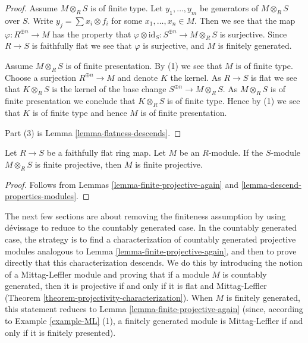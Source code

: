 \begin{proof}
Assume $M \otimes_R S$ is of finite type. Let $y_1, \ldots, y_m$ be generators
of $M \otimes_R S$ over $S$. Write $y_j = \sum x_i \otimes f_i$ for some
$x_1, \ldots, x_n \in M$. Then we see that the map
$\varphi : R^{\oplus n} \to M$
has the property that
$\varphi \otimes \text{id}_S : S^{\oplus n} \to M \otimes_R S$
is surjective. Since $R \to S$ is faithfully flat we see that
$\varphi$ is surjective, and $M$ is finitely generated.

\medskip\noindent
Assume $M \otimes_R S$ is of finite presentation. By (1) we see that
$M$ is of finite type. Choose a surjection $R^{\oplus n} \to M$ and
denote $K$ the kernel. As $R \to S$ is flat we see that $K \otimes_R S$
is the kernel of the base change $S^{\oplus n} \to M \otimes_R S$.
As $M \otimes_R S$ is of finite presentation we conclude that $K \otimes_R S$
is of finite type. Hence by (1) we see that $K$ is of finite type
and hence $M$ is of finite presentation.

\medskip\noindent
Part (3) is
Lemma \ref{lemma-flatness-descends}.
\end{proof}

\begin{proposition}
\label{proposition-ffdescent-finite-projectivity}
Let $R \to S$ be a faithfully flat ring map.  Let $M$ be an $R$-module.
If the $S$-module $M \otimes_R S$ is finite projective, then $M$ is finite
projective.
\end{proposition}

\begin{proof}
Follows from
Lemmas \ref{lemma-finite-projective-again} and
\ref{lemma-descend-properties-modules}.
\end{proof}

\noindent
The next few sections are about removing the finiteness assumption by using
d\'evissage to reduce to the countably generated case.  In the countably
generated case, the strategy is to find a characterization of countably
generated projective modules analogous to
Lemma \ref{lemma-finite-projective-again},
and then to prove directly that this characterization descends. We do this by
introducing the notion of a Mittag-Leffler module and proving that if a module
$M$ is countably generated, then it is projective if and only if it is flat and
Mittag-Leffler (Theorem \ref{theorem-projectivity-characterization}).  When $M$
is finitely generated, this statement reduces to Lemma
\ref{lemma-finite-projective-again} (since, according to
Example \ref{example-ML} (1),
a finitely generated module is Mittag-Leffler if and only if it is
finitely presented).

